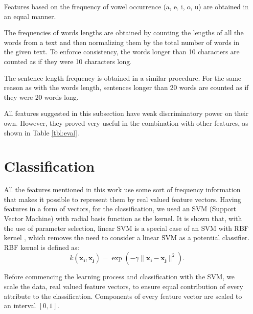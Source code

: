 \documentclass{llncs}
\begin{document}
Features based on the frequency of vowel occurrence (a, e, i, o, u) are
obtained in an equal manner.

The frequencies of words lengths are obtained by counting the lengths of all
the words from a text and then normalizing them by the total number of words in
the given text. To enforce consistency, the words longer than 10 characters are
counted as if they were 10 characters long.

The sentence length frequency is obtained in a similar procedure.
For the same reason as with the words length, sentences longer than 20 words are
counted as if they were 20 words long.

All features suggested in this subsection have weak discriminatory power
on their own. However, they proved very useful in the combination with other features, as
shown in Table \ref{tbl:eval}.

\section{Classification}
All the features mentioned in this work use some sort of frequency information
that makes it possible to represent them by real valued feature vectors. Having
features in a form of vectors, for the classification, we used an SVM (Support
Vector Machine) with radial basis function as the kernel. It is shown that, with
the use of parameter selection, linear SVM is a special case of an SVM with RBF
kernel \cite{keerthi2003asymptotic}, which removes the need to consider a linear
SVM as a potential classifier. RBF kernel is defined as:
\begin{equation}
k(\mathbf{x_i},\mathbf{x_j})=\exp(-\gamma \|\mathbf{x_i} - \mathbf{x_j}\|^2).
\end{equation}

Before commencing the learning process and classification with the SVM, we scale
the data, real valued feature vectors, to ensure equal contribution of every attribute to
the classification. Components of every feature vector are scaled to an interval
$[0, 1]$.
\end{document}
